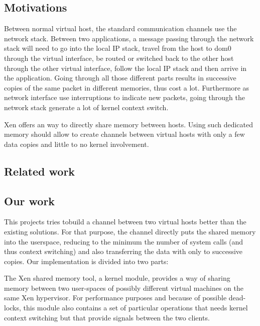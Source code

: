 \documentclass[journal]{IEEEtran}
\begin{document}
\subsection{Motivations}

Between normal virtual host, the standard communication channels use the network stack.
Between two applications, a message passing through the network stack will need to go into the local IP stack, travel from the host to dom0 through the virtual interface, be routed or switched back to the other host through the other virtual interface, follow the local IP stack and then arrive in the application.
Going through all those different parts results in successive copies of the same packet in different memories, thus cost a lot.
Furthermore as network interface use interruptions to indicate new packets, going through the network stack generate a lot of kernel context switch.



Xen offers an way to directly share memory between hosts.
Using such dedicated memory should allow to create channels between virtual hosts with only a few data copies and little to no kernel involvement.

\subsection{Related work}




\subsection{Our work}

This projects tries tobuild a channel between two virtual hosts better than the existing solutions. For that purpose, the channel directly puts the shared memory into the userspace, reducing to the minimum the number of system calls (and thus context switching) and also transferring the data with only to successive copies. Our implementation is divided into two parts:



The Xen shared memory tool, a kernel module, provides a way of sharing memory between two user-spaces of possibly different virtual machines on the same Xen hypervisor.
For performance purposes and because of possible dead-locks, this module also contains a set of particular operations that needs kernel context switching but that provide signals between
the two clients.
\end{document}
